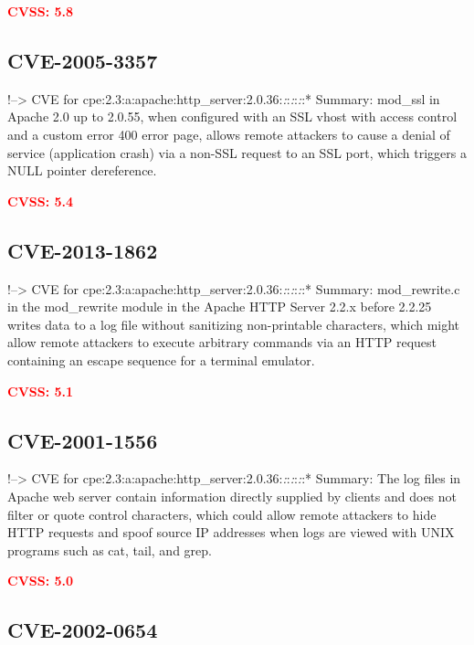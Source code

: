 \documentclass[a4paper, 12pt]{article}
\begin{document}
\textbf{\textcolor{red}{CVSS: 5.8}}

\hypertarget{cve-2005-3357}{%
\subsection{CVE-2005-3357}\label{cve-2005-3357}}

!--\textgreater{} CVE for
cpe:2.3:a:apache:http\_server:2.0.36:\emph{:}:\emph{:}:\emph{:}:*
Summary: mod\_ssl in Apache 2.0 up to 2.0.55, when configured with an
SSL vhost with access control and a custom error 400 error page, allows
remote attackers to cause a denial of service (application crash) via a
non-SSL request to an SSL port, which triggers a NULL pointer
dereference.

\textbf{\textcolor{red}{CVSS: 5.4}}

\hypertarget{cve-2013-1862}{%
\subsection{CVE-2013-1862}\label{cve-2013-1862}}

!--\textgreater{} CVE for
cpe:2.3:a:apache:http\_server:2.0.36:\emph{:}:\emph{:}:\emph{:}:*
Summary: mod\_rewrite.c in the mod\_rewrite module in the Apache HTTP
Server 2.2.x before 2.2.25 writes data to a log file without sanitizing
non-printable characters, which might allow remote attackers to execute
arbitrary commands via an HTTP request containing an escape sequence for
a terminal emulator.

\textbf{\textcolor{red}{CVSS: 5.1}}

\hypertarget{cve-2001-1556}{%
\subsection{CVE-2001-1556}\label{cve-2001-1556}}

!--\textgreater{} CVE for
cpe:2.3:a:apache:http\_server:2.0.36:\emph{:}:\emph{:}:\emph{:}:*
Summary: The log files in Apache web server contain information directly
supplied by clients and does not filter or quote control characters,
which could allow remote attackers to hide HTTP requests and spoof
source IP addresses when logs are viewed with UNIX programs such as cat,
tail, and grep.

\textbf{\textcolor{red}{CVSS: 5.0}}

\hypertarget{cve-2002-0654}{%
\subsection{CVE-2002-0654}\label{cve-2002-0654}}
\end{document}
